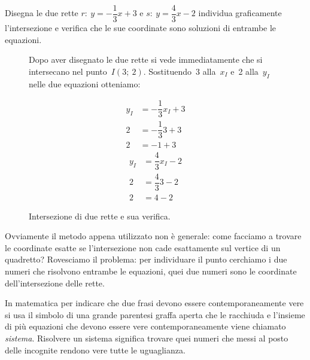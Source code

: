  \begin{esempio}
  Disegna le due rette \(r:~y = -\dfrac{1}{3} x +3\) e 
  \(s:~y = \dfrac{4}{3} x -2\) 
  individua graficamente l'intersezione e verifica che 
  le sue coordinate sono soluzioni di entrambe le equazioni.
\begin{inaccessibleblock}
 \begin{figure}[h]
 \centering
 \begin{minipage}[]{.49\textwidth}
 \intersezionea
 \end{minipage}
 \hfill
 \begin{minipage}[]{.49\textwidth}
Dopo aver disegnato le due rette si vede immediatamente che si intersecano 
nel punto~\(I(3;~2)\). 
Sostituendo~3 alla~\(x_I\) e~2 alla~\(y_I\) nelle due equazioni otteniamo:
\begin{multicols}{2}
\vspace*{-2.1em}
\begin{align*}
y_I &= -\dfrac{1}{3} x_I +3 \\
2 &= -\dfrac{1}{3} 3 +3 \\
2 &= -1 + 3
\end{align*} %
\begin{align*}
y_I &= \dfrac{4}{3} x_I -2 \\
2 &= \dfrac{4}{3} 3 -2 \\
2 &= 4 -2
\end{align*}
\end{multicols}
 \end{minipage}
\caption{Intersezione di due rette e sua verifica.}
\label{fig:elementi}
\end{figure}
\end{inaccessibleblock}
 \end{esempio}

Ovviamente il metodo appena utilizzato non è generale: come facciamo a trovare 
le coordinate esatte se l'intersezione non cade esattamente sul vertice di  
un quadretto? Rovesciamo il problema: per individuare il punto 
cerchiamo i due numeri che risolvono entrambe le equazioni, quei due numeri
sono le coordinate dell'intersezione delle rette.

In matematica per indicare che due frasi devono essere contemporaneamente 
vere si usa il simbolo di una grande parentesi graffa aperta che le racchiuda 
e l'insieme di più equazioni che devono essere vere contemporaneamente viene
chiamato \emph{sistema}. Risolvere un sistema significa trovare quei numeri 
che messi al posto delle incognite rendono vere tutte le uguaglianza.


